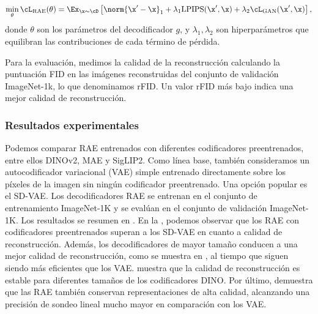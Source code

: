 \documentclass[../../book-main_es.tex]{subfiles}
\begin{document}
\begin{equation}
\min_{\theta} \cL_{\mathrm{RAE}}(\theta) = \Ex_{\x \sim \cD} \left[
    \norm{\x' - \x}_1 + \lambda_1 \mathrm{LPIPS}(\x', \x) + \lambda_2
\cL_{\mathrm{GAN}}(\x', \x) \right],
\end{equation}
donde $\theta$ son los parámetros del decodificador $g$, y $\lambda_1,
\lambda_2$ son hiperparámetros que equilibran las contribuciones de cada término de pérdida.

Para la evaluación, medimos la calidad de la reconstrucción calculando
la puntuación FID \cite{heusel2017gans} en las imágenes reconstruidas del
conjunto de validación ImageNet-1k, lo que denominamos rFID. Un valor rFID más bajo
indica una mejor calidad de reconstrucción.

\subsubsection{Resultados experimentales}
Podemos comparar RAE entrenados con diferentes codificadores preentrenados,
entre ellos DINOv2, MAE y SigLIP2. Como línea base, también consideramos un
autocodificador variacional (VAE) simple entrenado directamente sobre los píxeles de la imagen
sin ningún codificador preentrenado. Una opción popular es el SD-VAE.
Los decodificadores RAE se entrenan en el conjunto de entrenamiento ImageNet-1K y
se evalúan en el conjunto de validación ImageNet-1K. Los resultados se
resumen en . En la , 
podemos observar que los RAE con
codificadores preentrenados superan a los SD-VAE en cuanto a calidad de reconstrucción.
Además, los decodificadores de mayor tamaño conducen a una mejor calidad de reconstrucción,
como se muestra en , al tiempo que
siguen siendo más eficientes que los VAE. 
muestra que la calidad de reconstrucción es estable para diferentes
tamaños de los codificadores DINO. Por último, 
demuestra que las RAE también conservan representaciones de alta calidad,
alcanzando una precisión de sondeo lineal mucho mayor en comparación con los VAE.
\end{document}
